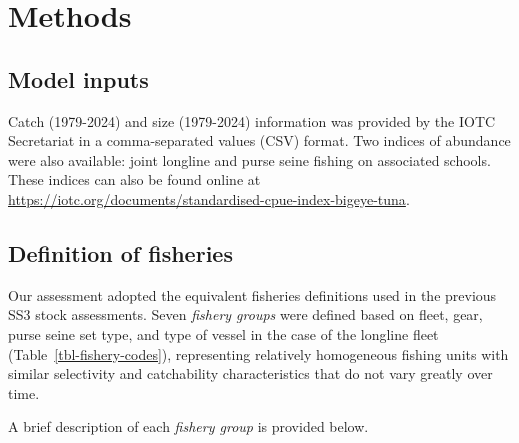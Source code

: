 \documentclass[
]{scrartcl}
\begin{document}
\section{Methods}\label{methods}

\subsection{Model inputs}\label{model-inputs}

Catch (1979-2024) and size (1979-2024) information was provided by the
IOTC Secretariat in a comma-separated values (CSV) format. Two indices
of abundance were also available: joint longline and purse seine fishing
on associated schools. These indices can also be found online at
\url{https://iotc.org/documents/standardised-cpue-index-bigeye-tuna}.

\subsection{Definition of fisheries}\label{definition-of-fisheries}

Our assessment adopted the equivalent fisheries definitions used in the
previous SS3 stock assessments. Seven \emph{fishery groups} were defined
based on fleet, gear, purse seine set type, and type of vessel in the
case of the longline fleet (Table~\ref{tbl-fishery-codes}), representing
relatively homogeneous fishing units with similar selectivity and
catchability characteristics that do not vary greatly over time.

A brief description of each \emph{fishery group} is provided below.
\end{document}
